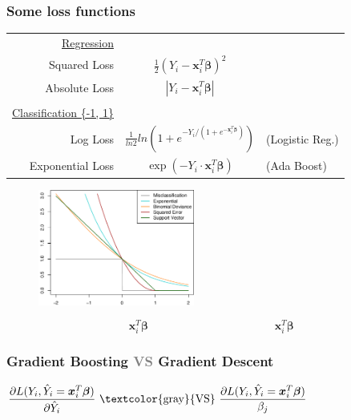 \documentclass[xcolor={dvipsnames}]{beamer}
\begin{document}
\frame
{
 \frametitle{Some loss functions}

\begin{tabular}{rcl}
\underline{Regression}\\
Squared Loss & $\frac{1}{2}(Y_i-{\boldsymbol x}_i^T \boldsymbol\beta)^2$ \\
Absolute Loss & $|Y_i-{\boldsymbol x}_i^T \boldsymbol\beta|$  \\\\
\underline{Classification \{-1, 1\}} \\
Log Loss & $\frac{1}{ln 2} ln(1+e^{-Y_i/\left(1+e^{-{\boldsymbol x}_i^T \boldsymbol\beta}\right)})$ &  (Logistic Reg.) \\
Exponential Loss & $\exp(-Y_i \cdot {\boldsymbol x}_i^T \boldsymbol\beta)$ & (Ada Boost)\\
\end{tabular}

\begin{figure}
\centering
{}\includegraphics[height=1.5in]{stuff/loss2.png}

\vspace{-1.75em}
$$\;\;{\boldsymbol x}_i^T \boldsymbol\beta \;\quad\quad\quad\quad\quad\quad\quad\quad\quad\quad\quad {\boldsymbol x}_i^T \boldsymbol\beta$$
\end{figure}


}


\frame
{
 \frametitle{Gradient Boosting \textcolor{gray}{VS} Gradient Descent}

\huge

\hspace*{-.75em}$\displaystyle \frac{\partial L(Y_i, \hat Y_i = \boldsymbol x_i^T\boldsymbol \beta)}{\partial \hat Y_i} \text{ \textcolor{gray}{VS} } \frac{\partial L(Y_i, \hat Y_i = \boldsymbol x_i^T\boldsymbol \beta)}{\beta_j}$

}
\end{document}
